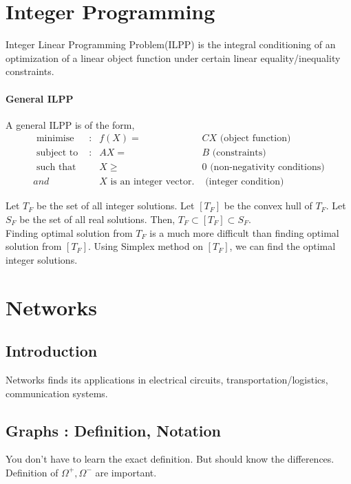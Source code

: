 \section{Integer Programming}
\begin{definition}
	Integer Linear Programming Problem(ILPP) is the integral conditioning of an optimization of a linear object function under certain linear equality/inequality constraints.
\end{definition}

\paragraph{General ILPP}
A general ILPP is of the form,
\begin{align}
	\text{ minimise } & : & f(X) = & CX  \text{ (object function)} \label{eqn:obj} \\
	\text{ subject to } & : & AX = & B \text{ (constraints)}\label{eqn:sub} \\
	\text{ such that } & & X \ge & 0 \text{ (non-negativity conditions)}\label{eqn:positive} \\
	and & & X \text{ is an integer vector}. & \text{ (integer condition) }
\end{align}

\begin{remark}
	Let $T_F$ be the set of all integer solutions.
	Let $[T_F]$ be the convex hull of $T_F$.
	Let $S_F$ be the set of all real solutions.
	Then, $T_F \subset [T_F] \subset S_F$.\\
	
	Finding optimal solution from $T_F$ is a much more difficult than finding optimal solution from $[T_F]$. Using Simplex method on $[T_F]$, we can find the optimal integer solutions.
\end{remark}
\pagebreak

\section{Networks}
\subsection{Introduction}
	Networks finds its applications in electrical circuits, transportation/logistics, communication systems.

\subsection{Graphs : Definition, Notation}
\begin{commentary}
	You don't have to learn the exact definition. But should know the differences. Definition of $\Omega^+, \Omega^-$ are important.
\end{commentary}

